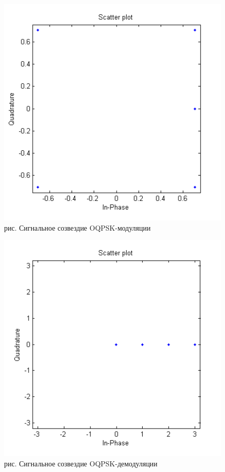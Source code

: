 \documentclass[10pt,a4paper]{report}
\begin{document}
\begin{figure}
\begin{center}
\includegraphics[width=150mm, scale = 0.9]{9_5}\newline
рис.  Сигнальное созвездие OQPSK-модуляции\newline
\end{center}
\end{figure}
\begin{figure}
\begin{center}
\includegraphics[width=150mm, scale = 0.9]{9_6}\newline
рис.  Сигнальное созвездие OQPSK-демодуляции\newline
\end{center}
\end{figure}
\end{document}
